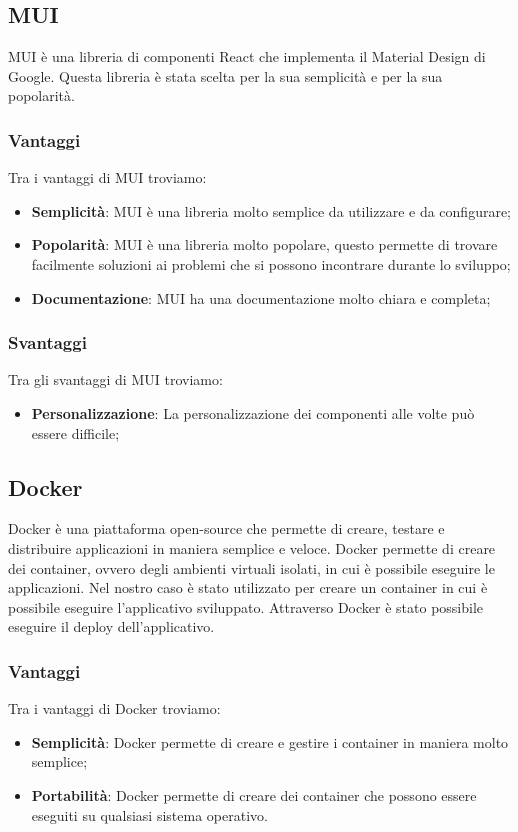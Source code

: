 \subsection*{MUI}
MUI è una libreria di componenti React che implementa il Material Design di Google.
Questa libreria è stata scelta per la sua semplicità e per la sua popolarità.

\subsubsection*{Vantaggi}
Tra i vantaggi di MUI troviamo:
\begin{itemize}
    \item \textbf{Semplicità}: MUI è una libreria molto semplice da utilizzare e da configurare;
    \item \textbf{Popolarità}: MUI è una libreria molto popolare, questo permette di trovare facilmente soluzioni ai problemi che si possono incontrare durante lo sviluppo;
    \item \textbf{Documentazione}: MUI ha una documentazione molto chiara e completa;
\end{itemize}

\subsubsection*{Svantaggi}
Tra gli svantaggi di MUI troviamo:
\begin{itemize}
    \item \textbf{Personalizzazione}: La personalizzazione dei componenti alle volte può essere difficile;
\end{itemize}


\subsection*{Docker}
Docker è una piattaforma open-source che permette di creare, testare e distribuire applicazioni in maniera semplice e veloce.
Docker permette di creare dei container, ovvero degli ambienti virtuali isolati, in cui è possibile eseguire le applicazioni. Nel nostro caso 
è stato utilizzato per creare un container in cui è possibile eseguire l'applicativo sviluppato. Attraverso Docker è stato possibile
eseguire il deploy dell'applicativo.

\subsubsection*{Vantaggi}
Tra i vantaggi di Docker troviamo:
\begin{itemize}
    \item \textbf{Semplicità}: Docker permette di creare e gestire i container in maniera molto semplice;
    \item \textbf{Portabilità}: Docker permette di creare dei container che possono essere eseguiti su qualsiasi sistema operativo.
\end{itemize}

